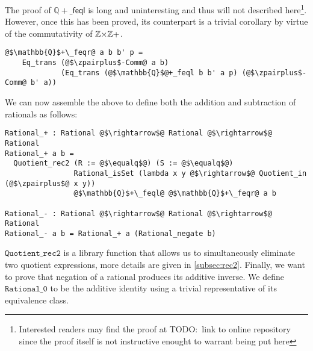 \documentclass[12pt,twoside,maitrise]{dms}
\theoremstyle{definition}
\numberwithin{equation}{section}
\numberwithin{table}{chapter}
\numberwithin{figure}{chapter}
\newcommand\kw[1] {\textsf{#1}}
\newcommand\id[1] {\texttt{#1}}
\begin{document}
The proof of $\mathbb{Q}{+}\_\kw{feql}$ is long and uninteresting and thus will
not described here\footnote{Interested readers may find the proof at TODO:\ link
to online repository since the proof itself is not instructive enought to
warrant being put here}. However, once this has been proved, its counterpart is
a trivial corollary by virtue of the commutativity of $\mathbb{Z}{\times}\mathbb{Z}+$.

\begin{verbatim}
@$\mathbb{Q}$+\_feqr@ a b b' p =
    Eq_trans (@$\zpairplus$-Comm@ a b)
             (Eq_trans (@$\mathbb{Q}$@+_feql b b' a p) (@$\zpairplus$-Comm@ b' a))
\end{verbatim}

We can now assemble the above to define both the addition and subtraction of
rationals as follows:

\begin{verbatim}
Rational_+ : Rational @$\rightarrow$@ Rational @$\rightarrow$@ Rational
Rational_+ a b =
  Quotient_rec2 (R := @$\equalq$@) (S := @$\equalq$@)
                Rational_isSet (lambda x y @$\rightarrow$@ Quotient_in (@$\zpairplus$@ x y))
                @$\mathbb{Q}$+\_feql@ @$\mathbb{Q}$+\_feqr@ a b

Rational_- : Rational @$\rightarrow$@ Rational @$\rightarrow$@ Rational
Rational_- a b = Rational_+ a (Rational_negate b)
\end{verbatim}

$\id{Quotient\_rec2}$ is a library function that allows us to simultaneously
eliminate two quotient expressions, more details are given in
\autoref{subsec:rec2}. Finally, we want to prove that negation of a rational
produces its additive inverse. We define $\id{Rational\_0}$ to be the additive
identity using a trivial representative of its equivalence class.
\end{document}
